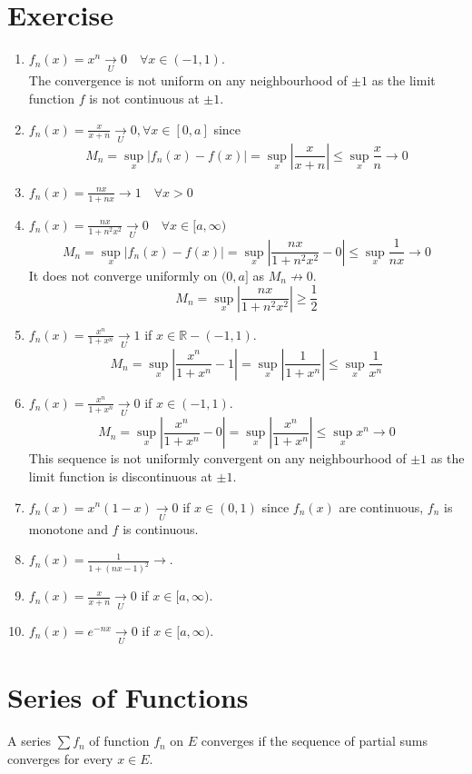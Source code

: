 \section*{Exercise}
\begin{enumerate}
	\item $f_n(x) = x^n \underset{U}{\to} 0 \quad \forall x \in (-1,1)$.\\
	The convergence is not uniform on any neighbourhood of $\pm 1$ as the limit function $f$ is not continuous at $\pm 1$.
	\item $f_n(x) = \frac{x}{x+n} \underset{U}{\to} 0,\forall x \in [0,a]$ since
	$$M_n = \sup_x |f_n(x) - f(x)| = \sup_x \left|\frac{x}{x+n}\right| \le \sup_x \frac{x}{n} \to 0$$
	\item $f_n(x) = \frac{nx}{1+nx} \to 1 \quad \forall x > 0$
	\item $f_n(x) = \frac{nx}{1+n^2x^2} \underset{U}{\to} 0 \quad \forall x \in [a,\infty)$ 
	$$M_n = \sup_x |f_n(x) - f(x)| = \sup_x \left|\frac{nx}{1+n^2x^2} - 0\right| \le \sup_x \frac{1}{nx} \to 0$$
	It does not converge uniformly on $(0,a]$ as $M_n \not\to 0$.
	$$M_n = \sup_x |\frac{nx}{1+n^2x^2}| \ge \frac{1}{2}$$
	\item $f_n(x) = \frac{x^n}{1+x^n} \underset{U}{\to} 1$ if $x \in \mathbb{R} - (-1,1)$.
	$$M_n = \sup_x \left|\frac{x^n}{1+x^n} - 1\right| = \sup_x \left|\frac{1}{1+x^n}\right| \le \sup_x \frac{1}{x^n}$$
	\item $f_n(x) = \frac{x^n}{1+x^n} \underset{U}{\to} 0$ if $x \in (-1,1)$.
		$$M_n = \sup_x \left|\frac{x^n}{1+x^n} - 0\right| = \sup_x \left|\frac{x^n}{1+x^n}\right| \le \sup_x x^n \to 0$$
	This sequence is not uniformly convergent on any neighbourhood of $\pm 1$ as the limit function is discontinuous at $\pm 1$.
	\item $f_n(x) = x^n(1-x) \underset{U}{\to} 0$ if $x \in (0,1)$ since $f_n(x)$ are continuous, $f_n$ is monotone and $f$ is continuous.
	\item $f_n(x) = \frac{1}{1+(nx-1)^2} \to $.
	\item $f_n(x) = \frac{x}{x+n} \underset{U}{\to} 0$ if $x \in [a,\infty)$.
	\item $f_n(x) = e^{-nx} \underset{U}{\to} 0$ if $x \in [a,\infty)$.
\end{enumerate}

\section{Series of Functions}
\begin{definition}
	A series $\sum f_n$ of function $f_n$ on $E$ converges if the sequence of partial sums converges for every $x \in E$.
\end{definition}

